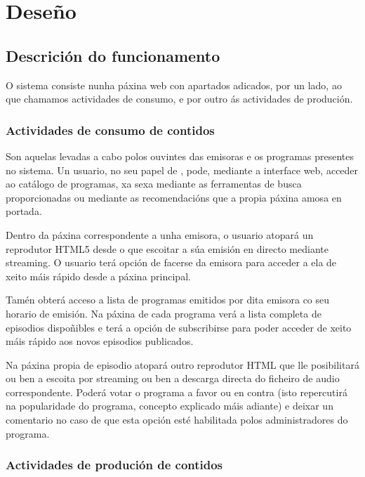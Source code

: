 \chapter[Deseño]{
  \label{chp:disenho}
  Deseño
}
\minitoc
\newpage

\section{Descrición do funcionamento}

O sistema consiste nunha páxina web con apartados adicados, por un lado, ao que chamamos actividades de consumo, e por outro ás actividades de produción.

\subsection{Actividades de consumo de contidos}

Son aquelas levadas a cabo polos ouvintes das emisoras e os programas presentes no sistema. Un usuario, no seu papel de , pode, mediante a interface web, acceder ao catálogo de programas, xa sexa mediante as ferramentas de busca proporcionadas ou mediante as recomendacións que a propia páxina amosa en portada.

Dentro da páxina correspondente a unha emisora, o usuario atopará un reprodutor HTML5 desde o que escoitar a súa emisión en directo mediante streaming. O usuario terá opción de facerse  da emisora para acceder a ela de xeito máis rápido desde a páxina principal.

Tamén obterá acceso a lista de programas emitidos por dita emisora co seu horario de emisión. Na páxina de cada programa verá a lista completa de episodios dispoñibles e terá a opción de subscribirse para poder acceder de xeito máis rápido aos novos episodios publicados.

Na páxina propia de episodio atopará outro reprodutor HTML que lle posibilitará ou ben a escoita por streaming ou ben a descarga directa do ficheiro de audio correspondente. Poderá votar o programa a favor ou en contra (isto repercutirá na popularidade do programa, concepto explicado máis adiante) e deixar un comentario no caso de que esta opción esté habilitada polos administradores do programa.


\subsection{Actividades de produción de contidos}

